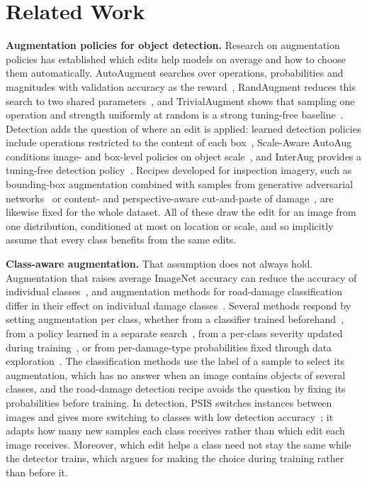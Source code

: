 \section{Related Work}
\label{sec:related}

\noindent\textbf{Augmentation policies for object detection.} Research on augmentation policies has established which edits help models on average and how to choose them automatically. AutoAugment searches over operations, probabilities and magnitudes with validation accuracy as the reward~\cite{cubuk2019auto}, RandAugment reduces this search to two shared parameters~\cite{cubuk2020rand}, and TrivialAugment shows that sampling one operation and strength uniformly at random is a strong tuning-free baseline~\cite{muller2021trivial}. Detection adds the question of where an edit is applied: learned detection policies include operations restricted to the content of each box~\cite{zoph2020det}, Scale-Aware AutoAug conditions image- and box-level policies on object scale~\cite{chen2021scale}, and InterAug provides a tuning-free detection policy~\cite{thopalli2023interaug}. Recipes developed for inspection imagery, such as bounding-box augmentation combined with samples from generative adversarial networks~\cite{aghayan2024} or content- and perspective-aware cut-and-paste of damage~\cite{rdd_cutpaste}, are likewise fixed for the whole dataset. All of these draw the edit for an image from one distribution, conditioned at most on location or scale, and so implicitly assume that every class benefits from the same edits.

\noindent\textbf{Class-aware augmentation.} That assumption does not always hold. Augmentation that raises average ImageNet accuracy can reduce the accuracy of individual classes~\cite{kirichenko2023}, and augmentation methods for road-damage classification differ in their effect on individual damage classes~\cite{tsuchiya2019}. Several methods respond by setting augmentation per class, whether from a classifier trained beforehand~\cite{yoo2023}, from a policy learned in a separate search~\cite{cheung2022adaaug}, from a per-class severity updated during training~\cite{ahn2023cuda}, or from per-damage-type probabilities fixed through data exploration~\cite{rdd_detectron2}. The classification methods use the label of a sample to select its augmentation, which has no answer when an image contains objects of several classes, and the road-damage detection recipe avoids the question by fixing its probabilities before training. In detection, PSIS switches instances between images and gives more switching to classes with low detection accuracy~\cite{wang2019psis}; it adapts how many new samples each class receives rather than which edit each image receives. Moreover, which edit helps a class need not stay the same while the detector trains, which argues for making the choice during training rather than before it.

